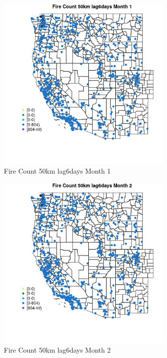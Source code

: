 \begin{figure} 
\centering  
\includegraphics[width=0.77\textwidth]{Code_Outputs/Report_ML_input_PM25_Step4_part_f_de_duplicated_aves_prioritize_24hr_obswNAs_MapObsMo1Fire_Count_50km_lag6days.jpg} 
\caption{\label{fig:Report_ML_input_PM25_Step4_part_f_de_duplicated_aves_prioritize_24hr_obswNAsMapObsMo1Fire_Count_50km_lag6days}Fire Count 50km lag6days Month 1} 
\end{figure} 
 

\begin{figure} 
\centering  
\includegraphics[width=0.77\textwidth]{Code_Outputs/Report_ML_input_PM25_Step4_part_f_de_duplicated_aves_prioritize_24hr_obswNAs_MapObsMo2Fire_Count_50km_lag6days.jpg} 
\caption{\label{fig:Report_ML_input_PM25_Step4_part_f_de_duplicated_aves_prioritize_24hr_obswNAsMapObsMo2Fire_Count_50km_lag6days}Fire Count 50km lag6days Month 2} 
\end{figure} 
 

